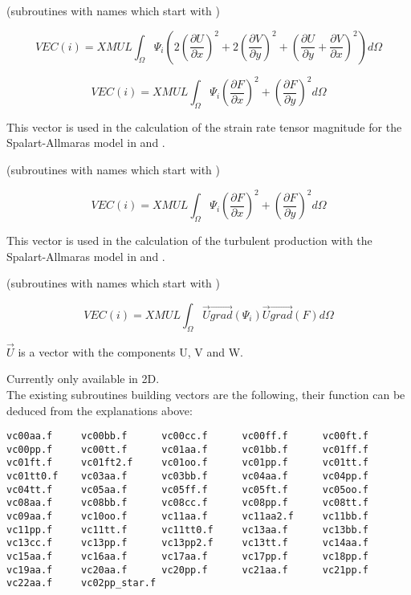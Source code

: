 
(subroutines with names which start with )

\[VEC(i)=XMUL \int _{\Omega }\Psi _{i}  \left(2 \left(\frac{\partial U}{\partial x} \right)^{2} +2 \left(\frac{\partial V}{\partial y} \right)^{2} + \left(\frac{\partial U}{\partial y} +\frac{\partial V}{\partial x} \right)^{2} \right)    d\Omega  \]

\[VEC(i)=XMUL \int _{\Omega }\Psi _{i}  \left(\frac{\partial F}{\partial x} \right)^2 + \left(\frac{\partial F}{\partial y} \right)^2 d\Omega  \]

This vector is used in the calculation of the strain rate tensor magnitude for
the Spalart-Allmaras model in  and .


(subroutines with names which start with )

\[VEC(i)=XMUL \int _{\Omega }\Psi _{i}  \left(\frac{\partial F}{\partial x} \right)^2 + \left(\frac{\partial F}{\partial y} \right)^2 d\Omega  \]

This vector is used in the calculation of the turbulent production with the
Spalart-Allmaras model in  and .


(subroutines with names which start with )

\[VEC(i)=XMUL
\int _{\Omega }
\vec{U} \overrightarrow{grad} ( \Psi _{i}  )
\vec{U} \overrightarrow{grad} ( F ) d\Omega  \]

$\vec{U}$ is a vector with the components U, V and W.

Currently only available in 2D.
\\

The existing subroutines building vectors are the following,
their function can be deduced from the explanations above:

\begin{verbatim}
vc00aa.f     vc00bb.f      vc00cc.f      vc00ff.f      vc00ft.f
vc00pp.f     vc00tt.f      vc01aa.f      vc01bb.f      vc01ff.f
vc01ft.f     vc01ft2.f     vc01oo.f      vc01pp.f      vc01tt.f
vc01tt0.f    vc03aa.f      vc03bb.f      vc04aa.f      vc04pp.f
vc04tt.f     vc05aa.f      vc05ff.f      vc05ft.f      vc05oo.f
vc08aa.f     vc08bb.f      vc08cc.f      vc08pp.f      vc08tt.f
vc09aa.f     vc10oo.f      vc11aa.f      vc11aa2.f     vc11bb.f
vc11pp.f     vc11tt.f      vc11tt0.f     vc13aa.f      vc13bb.f
vc13cc.f     vc13pp.f      vc13pp2.f     vc13tt.f      vc14aa.f
vc15aa.f     vc16aa.f      vc17aa.f      vc17pp.f      vc18pp.f
vc19aa.f     vc20aa.f      vc20pp.f      vc21aa.f      vc21pp.f
vc22aa.f     vc02pp_star.f
\end{verbatim}

